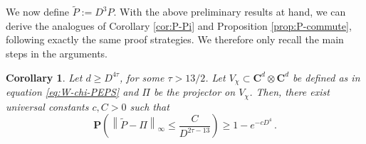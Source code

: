 \documentclass{amsart}
\newtheorem{corollary}[theorem]{Corollary}
\newcommand{\C}{\mathbf{C}}
\renewcommand{\P}{\mathbf{P}}
\renewcommand{\leq}{\leqslant}
\renewcommand{\geq}{\geqslant}
\begin{document}

We now define $\widetilde{P}:= D^3P$. With the above preliminary results at hand, we can derive the analogues of Corollary \ref{cor:P-Pi} and Proposition \ref{prop:P-commute}, following exactly the same proof strategies. We therefore only recall the main steps in the arguments.

\begin{corollary} \label{cor:P-Pi-PEPS}
    Let $d\geq D^{4\tau}$, for some $\tau>13/2$. Let $V_{\chi}\subset{\C^d\otimes\C^d}$ be defined as in equation \eqref{eq:W-chi-PEPS} and $\Pi$ be the projector on $V_{\chi}$. Then, there exist universal constants $c,C>0$ such that
    \[ \P\left( \left\| \widetilde{P}-\Pi\right\|_{\infty} \leq \frac{C}{D^{2\tau-13}} \right) \geq 1-e^{-cD^4} \, . \]
\end{corollary}
\end{document}
